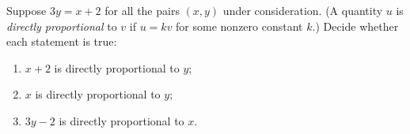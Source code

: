 Suppose $3y=x+2$ for all the pairs $(x,y)$ under consideration. (A quantity $u$ is \emph{directly proportional} to $v$ if $u=kv$ for some nonzero constant $k$.) Decide whether each statement is true:
\begin{enumerate}
\item[(a)] $x+2$ is directly proportional to $y$;
\item[(b)] $x$ is directly proportional to $y$;
\item[(c)] $3y-2$ is directly proportional to $x$.
\end{enumerate}
